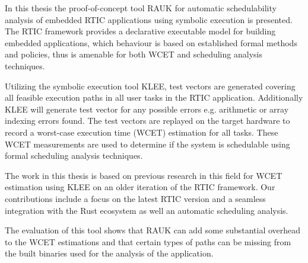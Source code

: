In this thesis the proof-of-concept tool RAUK for automatic schedulability
analysis of embedded RTIC applications using symbolic execution is presented.
The RTIC framework provides a declarative executable model for building
embedded applications, which behaviour is based on established formal methods
and policies, thus is amenable for both WCET and scheduling analysis techniques.

Utilizing the symbolic execution tool KLEE, test vectors are generated covering all
feasible execution paths in all user tasks in the RTIC application.
Additionally KLEE will generate test vector for any possible errors e.g.
arithmetic or array indexing errors found. The test vectors are replayed on the
target hardware to record a worst-case execution time (WCET) estimation for all
tasks. These WCET measurements are used to determine if the system is
schedulable using formal scheduling analysis techniques.

The work in this thesis is based on previous research in this field for WCET
estimation using KLEE on an older iteration of the RTIC framework. Our
contributions include a focus on the latest RTIC version and a seamless
integration with the Rust ecosystem as well an automatic scheduling analysis.

The evaluation of this tool shows that RAUK can add some substantial overhead
to the WCET estimations and that certain types of paths can be missing from the
built binaries used for the analysis of the application.

